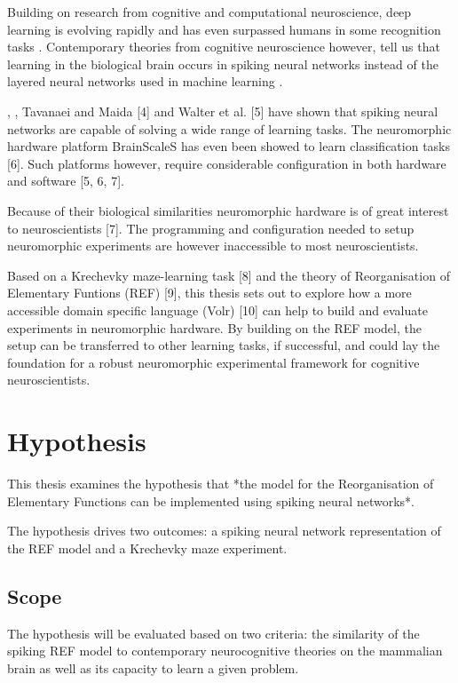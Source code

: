 \documentclass[report.tex]{subfiles}
\begin{document}
Building on research from cognitive and computational neuroscience, deep
learning is evolving rapidly and has even surpassed humans in some
recognition tasks \cite{Schmidhuber2015}.
Contemporary theories from cognitive neuroscience however, tell us
that learning in the biological brain occurs in spiking neural networks
instead of the layered neural networks used in machine learning
\cite{Dayan2001}.

\textcite{Pfeil2013}, , Tavanaei and Maida [4] and Walter et al. [5] have
shown that spiking neural networks are capable of solving a wide range
of learning tasks.
The neuromorphic hardware platform BrainScaleS has even been showed to
learn classification tasks [6]. Such platforms however, require
considerable configuration in both hardware and software [5, 6, 7].

Because of their biological similarities neuromorphic hardware is of
great interest to neuroscientists [7].
The programming and configuration needed to setup neuromorphic
experiments are however inaccessible to most neuroscientists.

Based on a Krechevky maze-learning task [8] and the theory of Reorganisation of Elementary Funtions (REF) [9], this thesis sets out to explore how a more accessible domain specific language (Volr) [10] can help to build and evaluate experiments in neuromorphic hardware.
By building on the REF model, the setup can be transferred to other learning tasks, if successful, and could lay the foundation for a robust neuromorphic experimental framework for cognitive neuroscientists.

\section{Hypothesis}
This thesis examines the hypothesis that *the model for the Reorganisation of Elementary Functions can be implemented using spiking neural networks*.

The hypothesis drives two outcomes: a spiking neural network representation of the REF model and a Krechevky maze experiment.

\subsection{Scope}
The hypothesis will be evaluated based on two criteria: the similarity of the spiking REF model to contemporary neurocognitive theories on the mammalian brain as well as its capacity to learn a given problem.
\end{document}

